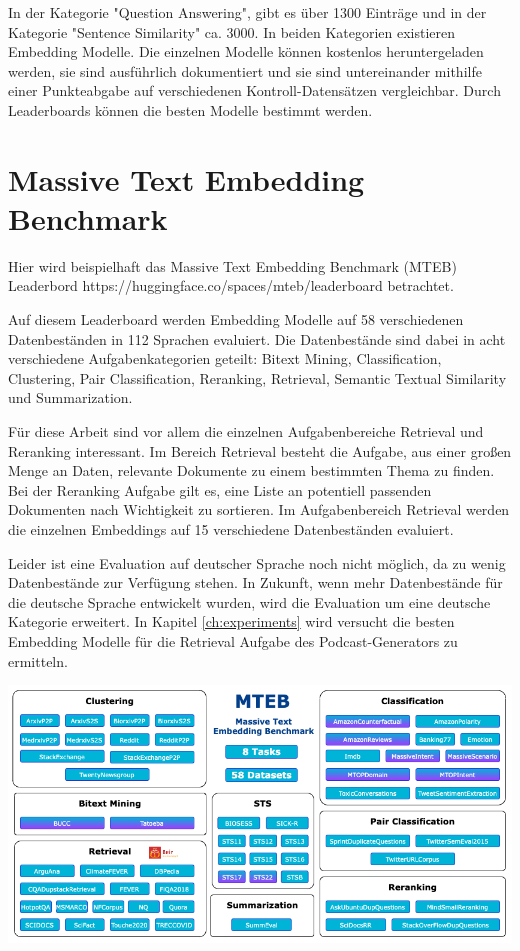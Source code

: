 In der Kategorie "Question Answering", gibt es über 1300 Einträge und in der Kategorie "Sentence Similarity" ca. 3000.
In beiden Kategorien existieren Embedding Modelle.
Die einzelnen Modelle können kostenlos heruntergeladen werden, sie sind ausführlich dokumentiert und sie sind untereinander mithilfe einer Punkteabgabe auf verschiedenen Kontroll-Datensätzen vergleichbar.
Durch Leaderboards können die besten Modelle bestimmt werden.

\section{Massive Text Embedding Benchmark}

Hier wird beispielhaft das Massive Text Embedding Benchmark (MTEB) Leaderbord https://huggingface.co/spaces/mteb/leaderboard betrachtet.

Auf diesem Leaderboard werden Embedding Modelle auf 58 verschiedenen Datenbeständen in 112 Sprachen evaluiert.
Die Datenbestände sind dabei in acht verschiedene Aufgabenkategorien geteilt:
Bitext Mining, Classification, Clustering, Pair Classification, Reranking, Retrieval, Semantic Textual Similarity und Summarization.

Für diese Arbeit sind vor allem die einzelnen Aufgabenbereiche Retrieval und Reranking interessant. Im Bereich Retrieval besteht die Aufgabe, aus einer großen Menge an Daten, relevante Dokumente zu einem bestimmten Thema zu finden.
Bei der Reranking Aufgabe gilt es, eine Liste an potentiell passenden Dokumenten nach Wichtigkeit zu sortieren.
Im Aufgabenbereich Retrieval werden die einzelnen Embeddings auf 15 verschiedene Datenbeständen evaluiert.

\cite{muennighoff2023}

Leider ist eine Evaluation auf deutscher Sprache noch nicht möglich, da zu wenig Datenbestände zur Verfügung stehen. 
In Zukunft, wenn mehr Datenbestände für die deutsche Sprache entwickelt wurden, wird die Evaluation um eine deutsche Kategorie erweitert. \cite{muennighoff2023a}
In Kapitel \autoref{ch:experiments} wird versucht die besten Embedding Modelle für die Retrieval Aufgabe des Podcast-Generators zu ermitteln.


\includegraphics[width=\linewidth]{figures/mteb.png}



